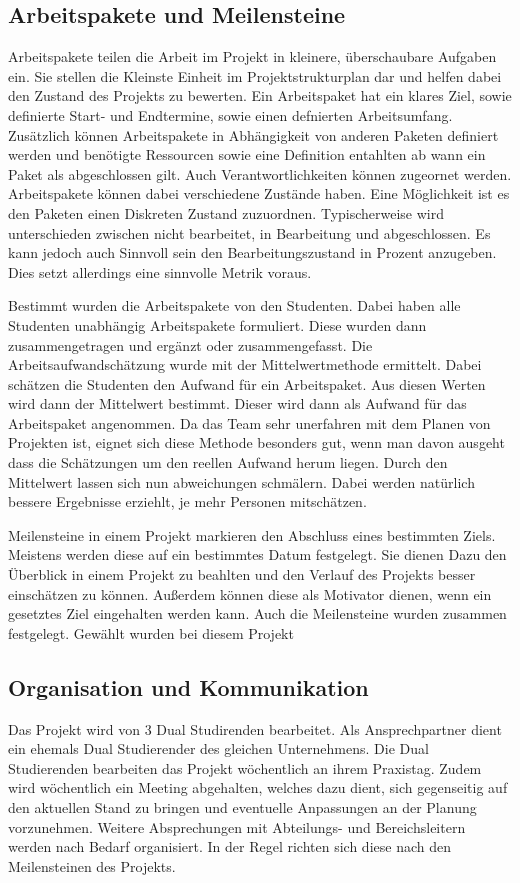\documentclass[12pt,oneside]{article}
\begin{document}
\subsection{Arbeitspakete und Meilensteine}
Arbeitspakete teilen die Arbeit im Projekt in kleinere, überschaubare Aufgaben ein. Sie stellen die Kleinste Einheit im Projektstrukturplan dar und helfen dabei den Zustand des Projekts zu bewerten.
Ein Arbeitspaket hat ein klares Ziel, sowie definierte Start- und Endtermine, sowie einen defnierten Arbeitsumfang. Zusätzlich können Arbeitspakete in Abhängigkeit von anderen Paketen definiert werden und benötigte Ressourcen sowie eine Definition entahlten ab wann ein Paket als abgeschlossen gilt. Auch Verantwortlichkeiten können zugeornet werden. 
Arbeitspakete können dabei verschiedene Zustände haben. Eine Möglichkeit ist es den Paketen einen Diskreten Zustand zuzuordnen. Typischerweise wird unterschieden zwischen nicht bearbeitet, in Bearbeitung und abgeschlossen. Es kann jedoch auch Sinnvoll sein den Bearbeitungszustand in Prozent anzugeben. Dies setzt allerdings eine sinnvolle Metrik voraus. 

Bestimmt wurden die Arbeitspakete von den Studenten. Dabei haben alle Studenten unabhängig Arbeitspakete formuliert. Diese wurden dann zusammengetragen und ergänzt oder zusammengefasst.
Die Arbeitsaufwandschätzung wurde mit der Mittelwertmethode ermittelt. Dabei schätzen die Studenten den Aufwand für ein Arbeitspaket. Aus diesen Werten wird dann der Mittelwert bestimmt. Dieser wird dann als Aufwand für das Arbeitspaket angenommen. 
Da das Team sehr unerfahren mit dem Planen von Projekten ist, eignet sich diese Methode besonders gut, wenn man davon ausgeht dass die Schätzungen um den reellen Aufwand herum liegen. Durch den Mittelwert lassen sich nun abweichungen schmälern. Dabei werden natürlich bessere Ergebnisse erziehlt, je mehr Personen mitschätzen. 

Meilensteine in einem Projekt markieren den Abschluss eines bestimmten Ziels. Meistens werden diese auf ein bestimmtes Datum festgelegt. Sie dienen Dazu den Überblick in einem Projekt zu beahlten und den Verlauf des Projekts besser einschätzen zu können. Außerdem können diese als Motivator dienen, wenn ein gesetztes Ziel eingehalten werden kann. 
Auch die Meilensteine wurden zusammen festgelegt. Gewählt wurden bei diesem Projekt  


\subsection{Organisation und Kommunikation}
Das Projekt wird von 3 Dual Studirenden bearbeitet. Als Ansprechpartner dient ein ehemals Dual Studierender des gleichen Unternehmens. Die Dual Studierenden bearbeiten das Projekt wöchentlich an ihrem Praxistag. Zudem wird wöchentlich ein Meeting abgehalten, welches dazu dient, sich gegenseitig auf den aktuellen Stand zu bringen und eventuelle Anpassungen an der Planung vorzunehmen. Weitere Absprechungen mit Abteilungs- und Bereichsleitern werden nach Bedarf organisiert. In der Regel richten sich diese nach den Meilensteinen des Projekts.  
\end{document}
